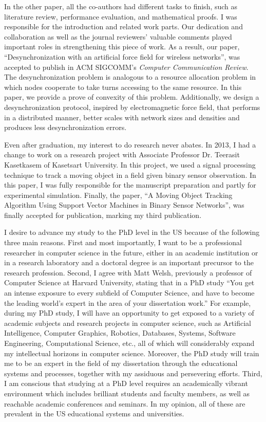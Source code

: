 \documentclass[a4paper,10pt]{report}
\begin{document}
\vspace{0.2cm}
In the other paper, all the co-authors had different tasks to finish, such as literature review, performance evaluation, and mathematical proofs. I was responsible for the introduction and related work parts. Our dedication and collaboration as well as the journal reviewers' valuable comments played important roles in strengthening this piece of work.  As a result, our paper, ``Desynchronization with an artificial force field for wireless networks'', was accepted to publish in ACM SIGCOMM's \textit{Computer Communication Review}. The desynchronization problem is analogous to a resource allocation problem in which nodes cooperate to take turns accessing to the same resource. In this paper, we provide a prove of convexity of this problem. Additionally, we design a desynchronization protocol, inspired by electromagnetic force field, that performs in a distributed manner, better scales with network sizes and densities and produces less desynchronization errors.

\vspace{0.2cm}
Even after graduation, my interest to do research never abates. In 2013, I had a change to work on a research project with Associate Professor Dr. Teerasit Kasetkasem of Kasetsart University. In this project, we used a signal processing technique to track a moving object in a field given binary sensor observation. In this paper, I was fully responsible for the manuscript preparation and partly for experimental simulation. Finally, the paper, ``A Moving Object Tracking Algorithm Using Support Vector Machines in Binary Sensor Networks'', was finally accepted for publication, marking my third publication. 

\vspace{0.2cm}
I desire to advance my study to the PhD level in the US because of the following three main reasons. First and most importantly, I want to be a professional researcher in computer science in the future, either in an academic institution or in a research laboratory and a doctoral degree is an important precursor to the research profession. Second, I agree with Matt Welsh, previously a professor of Computer Science at Harvard University, stating that in a PhD study ``You get an intense exposure to every subfield of Computer Science, and have to become the leading world's expert in the area of your dissertation work.'' For example, during my PhD study, I will have an opportunity to get exposed to a variety of academic subjects and research projects in computer science, such as Artificial Intelligence, Computer Graphics, Robotics, Databases, Systems, Software Engineering, Computational Science, etc., all of which will considerably expand my intellectual horizons in computer science. Moreover, the PhD study will train me to be an expert in the field of my dissertation through the educational systems and processes, together with my assiduous and persevering efforts. Third, I am conscious that studying at a PhD level requires an academically vibrant environment which includes brilliant students and faculty members, as well as reachable academic conferences and seminars. In my opinion, all of these are prevalent in the US educational systems and universities.
\end{document}
